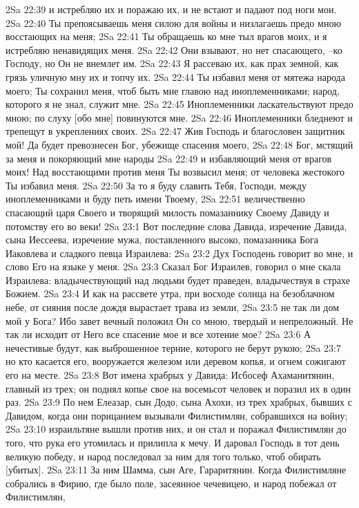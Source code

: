 2Sa 22:39  и истребляю их и поражаю их, и не встают и падают под ноги мои.
2Sa 22:40  Ты препоясываешь меня силою для войны и низлагаешь предо мною восстающих на меня;
2Sa 22:41  Ты обращаешь ко мне тыл врагов моих, и я истребляю ненавидящих меня.
2Sa 22:42  Они взывают, но нет спасающего, --ко Господу, но Он не внемлет им.
2Sa 22:43  Я рассеваю их, как прах земной, как грязь уличную мну их и топчу их.
2Sa 22:44  Ты избавил меня от мятежа народа моего; Ты сохранил меня, чтоб быть мне главою над иноплеменниками; народ, которого я не знал, служит мне.
2Sa 22:45  Иноплеменники ласкательствуют предо мною; по слуху [обо мне] повинуются мне.
2Sa 22:46  Иноплеменники бледнеют и трепещут в укреплениях своих.
2Sa 22:47  Жив Господь и благословен защитник мой! Да будет превознесен Бог, убежище спасения моего,
2Sa 22:48  Бог, мстящий за меня и покоряющий мне народы
2Sa 22:49  и избавляющий меня от врагов моих! Над восстающими против меня Ты возвысил меня; от человека жестокого Ты избавил меня.
2Sa 22:50  За то я буду славить Тебя, Господи, между иноплеменниками и буду петь имени Твоему,
2Sa 22:51  величественно спасающий царя Своего и творящий милость помазаннику Своему Давиду и потомству его во веки!
2Sa 23:1  Вот последние слова Давида, изречение Давида, сына Иессеева, изречение мужа, поставленного высоко, помазанника Бога Иаковлева и сладкого певца Израилева:
2Sa 23:2  Дух Господень говорит во мне, и слово Его на языке у меня.
2Sa 23:3  Сказал Бог Израилев, говорил о мне скала Израилева: владычествующий над людьми будет праведен, владычествуя в страхе Божием.
2Sa 23:4  И как на рассвете утра, при восходе солнца на безоблачном небе, от сияния после дождя вырастает трава из земли,
2Sa 23:5  не так ли дом мой у Бога? Ибо завет вечный положил Он со мною, твердый и непреложный. Не так ли исходит от Него все спасение мое и все хотение мое?
2Sa 23:6  А нечестивые будут, как выброшенное терние, которого не берут рукою;
2Sa 23:7  но кто касается его, вооружается железом или деревом копья, и огнем сожигают его на месте.
2Sa 23:8  Вот имена храбрых у Давида: Исбосеф Ахаманитянин, главный из трех; он поднял копье свое на восемьсот человек и поразил их в один раз.
2Sa 23:9  По нем Елеазар, сын Додо, сына Ахохи, из трех храбрых, бывших с Давидом, когда они порицанием вызывали Филистимлян, собравшихся на войну;
2Sa 23:10  израильтяне вышли против них, и он стал и поражал Филистимлян до того, что рука его утомилась и прилипла к мечу. И даровал Господь в тот день великую победу, и народ последовал за ним для того только, чтоб обирать [убитых].
2Sa 23:11  За ним Шамма, сын Аге, Гараритянин. Когда Филистимляне собрались в Фирию, где было поле, засеянное чечевицею, и народ побежал от Филистимлян,
